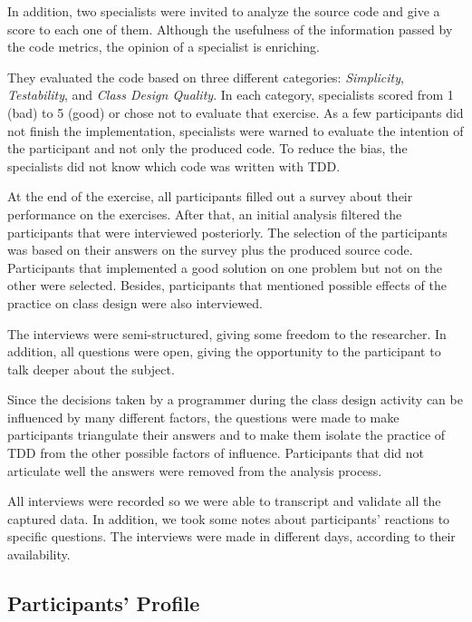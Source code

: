 \documentclass[times]{elsarticle}
\begin{document}
In addition, two specialists were invited to analyze the source code and give a score
to each one of them. Although the usefulness of the information passed by the code metrics,
the opinion of a specialist is enriching.

They evaluated the code based on three different categories: \textit{Simplicity}, \textit{Testability},
and \textit{Class Design Quality}. In each category, specialists scored from 1 (bad) to
5 (good) or chose not to evaluate that exercise. As a few participants did not finish the
implementation, specialists were warned to evaluate the intention of the participant and not
only the produced code.
To reduce the bias, the specialists did not know which code was written with TDD.

At the end of the exercise, all participants filled out a survey about their performance
on the exercises. After that, an initial analysis filtered the participants that
were interviewed posteriorly. The selection of the participants was based on
their answers on the survey plus the produced source code. Participants that implemented
a good solution on one problem but not on the other were selected. Besides, participants
that mentioned possible effects of the practice on class design were also interviewed.

The interviews were semi-structured, giving some freedom to the researcher. 
In addition, all questions were open, giving the
opportunity to the participant to talk deeper about the subject.

Since the decisions taken by a programmer during the class design activity can be
influenced by many different factors, the questions were made to make participants
triangulate their answers and to make them isolate the practice of TDD from
the other possible factors of influence. Participants that did not articulate well
the answers were removed from the analysis process.

All interviews were recorded so we were able to transcript and validate all
the captured data. In addition, we took some notes about participants' reactions
to specific questions. The interviews were made in different days,
according to their availability.

\subsection{Participants' Profile}
\label{sec:planejamento-participantes}
\end{document}
